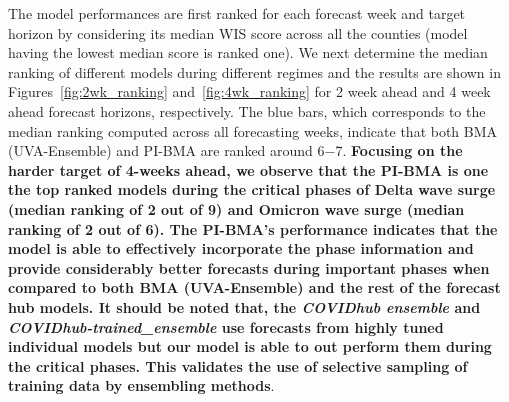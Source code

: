 \documentclass[conference,compsoc]{IEEEtran}
\begin{document}
The model performances are first ranked for each forecast week and target horizon by considering its median WIS score across all the counties (model having the lowest median score is ranked one). We next determine the median ranking of different models during different regimes and the results are shown in Figures~\ref{fig:2wk_ranking} and~\ref{fig:4wk_ranking} for 2 week ahead and 4 week ahead forecast horizons, respectively. The blue  bars, which corresponds to the median ranking computed across all forecasting weeks, indicate that both BMA (UVA-Ensemble) and PI-BMA are ranked around 6$-$7. \textbf{Focusing on the harder target of 4-weeks ahead, we observe that the PI-BMA is one the top ranked models during the critical phases of Delta wave surge (median ranking of 2 out of 9) and Omicron wave surge (median ranking of 2 out of 6). The PI-BMA's performance indicates that the model is able to effectively incorporate the phase information and provide considerably better forecasts during important phases when compared to both BMA (UVA-Ensemble) and the rest of the forecast hub models. It should be noted that, the \emph{COVIDhub ensemble} and \emph{COVIDhub-trained\_ensemble} use forecasts from highly tuned individual models but our model is able to out perform them during the critical phases. This validates the use of selective sampling of training data by ensembling methods}. 
%
%

\end{document}

